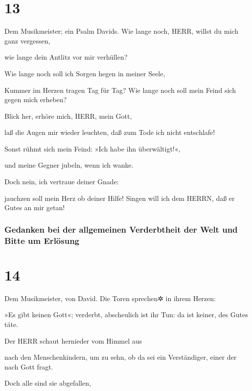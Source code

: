 \hypertarget{section-12}{%
\section{13}\label{section-12}}

Dem Musikmeister; ein Psalm Davids. Wie
lange noch, HERR, willst du mich ganz vergessen,

wie lange dein Antlitz vor mir verhüllen?

Wie lange noch soll ich Sorgen hegen in meiner Seele,

Kummer im Herzen tragen Tag für Tag? Wie lange noch soll mein Feind sich
gegen mich erheben?

Blick her, erhöre mich, HERR, mein Gott,

laß die Augen mir wieder leuchten, daß zum Tode ich nicht entschlafe!

Sonst rühmt sich mein Feind: »Ich habe ihn überwältigt!«,

und meine Gegner jubeln, wenn ich wanke.

Doch nein, ich vertraue deiner Gnade:

jauchzen soll mein Herz ob deiner Hilfe! Singen will ich dem HERRN, daß
er Gutes an mir getan!

\hypertarget{gedanken-bei-der-allgemeinen-verderbtheit-der-welt-und-bitte-um-erluxf6sung}{%
\subsubsection{Gedanken bei der allgemeinen Verderbtheit der Welt und
Bitte um
Erlösung}\label{gedanken-bei-der-allgemeinen-verderbtheit-der-welt-und-bitte-um-erluxf6sung}}

\hypertarget{section-13}{%
\section{14}\label{section-13}}

Dem Musikmeister, von David. Die Toren sprechen✲ in ihrem
Herzen:

»Es gibt keinen Gott«; verderbt, abscheulich ist ihr Tun: da ist keiner,
des Gutes täte.

Der HERR schaut hernieder vom Himmel aus

nach den Menschenkindern, um zu sehn, ob da sei ein Verständiger, einer
der nach Gott fragt.

Doch alle sind sie abgefallen,

